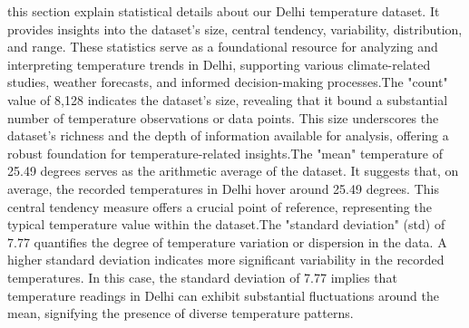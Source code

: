 \documentclass[sn-mathphys,Numbered]{sn-jnl}
\theoremstyle{thmstyleone}
\theoremstyle{thmstyletwo}
\theoremstyle{thmstylethree}
\begin{document}
this section explain statistical details about our Delhi temperature dataset. It provides insights into the dataset's size, central tendency, variability, distribution, and range. These statistics serve as a foundational resource for analyzing and interpreting temperature trends in Delhi, supporting various climate-related studies, weather forecasts, and informed decision-making processes.The "count" value of 8,128 indicates the dataset's size, revealing that it bound a substantial number of temperature observations or data points. This size underscores the dataset's richness and the depth of information available for analysis, offering a robust foundation for temperature-related insights.The "mean" temperature of 25.49 degrees serves as the arithmetic average of the dataset. It suggests that, on average, the recorded temperatures in Delhi hover around 25.49 degrees. This central tendency measure offers a crucial point of reference, representing the typical temperature value within the dataset.The "standard deviation" (std) of 7.77 quantifies the degree of temperature variation or dispersion in the data. A higher standard deviation indicates more significant variability in the recorded temperatures. In this case, the standard deviation of 7.77 implies that temperature readings in Delhi can exhibit substantial fluctuations around the mean, signifying the presence of diverse temperature patterns.
\end{document}
